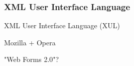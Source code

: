 %
%
%
%
%
%
%

\subsubsection{XML User Interface Language}
\label{xml_user_interface_language_heading}

XML User Interface Language (XUL)

Mozilla + Opera

"Web Forms 2.0"?
